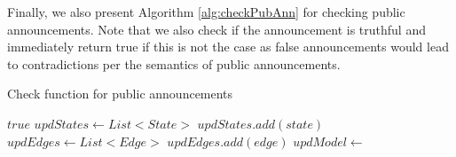 Finally, we also present Algorithm \ref{alg:checkPubAnn} for checking public announcements. Note that we also check if the announcement is truthful and immediately return true if this is not the case as false announcements would lead to contradictions per the semantics of public announcements.

\begin{algorithm}[H]
	\caption{Check function for public announcements}
	\label{alg:checkPubAnn}
	\begin{algorithmic}
			\State \Return $true$
		\EndIf
		\State $updStates \gets List <State>$
				\State $updStates.add(state)$
			\EndIf
		\EndFor
		\State $updEdges \gets List <Edge>$
				\State $updEdges.add(edge)$
			\EndIf
		\EndFor
		\State $updModel \gets$ 
		\State \Return {}
		\EndFunction
	\end{algorithmic}
\end{algorithm}